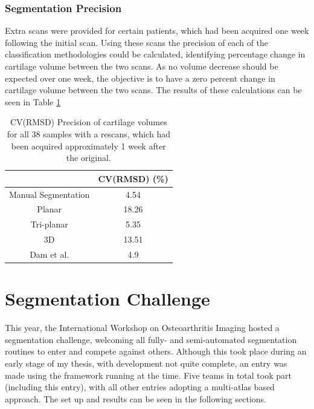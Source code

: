 \documentclass[11pt,a4paper]{memoir}
\numberwithin{figure}{section}
\numberwithin{table}{section}
\numberwithin{equation}{section}
\begin{document}
\subsubsection{Segmentation Precision}
 
Extra scans were provided for certain patients, which had been acquired one week following the initial scan. Using these scans the precision of each of the classification methodologies could be calculated, identifying percentage change in cartilage volume between the two scans. As no volume decrease should be expected over one week, the objective is to have a zero percent change in cartilage volume between the two scans. The results of these calculations can be seen in Table \ref{RMSDCV}

\begin{table}[!h]
\centering
\caption[Presicion of cartilage segmentation for all CNN architectures]{CV(RMSD) Precision of cartilage volumes for all 38 samples with a rescans, which had been acquired approximately 1 week after the original. }

\label{RMSDCV}
\begin{tabular}{|c|c|}
\hline
                  & CV(RMSD) (\%) \\ \hline
Manual Segmentation & 4.54         \\ \hline
Planar            & 18.26        \\ \hline
Tri-planar        & 5.35         \\ \hline
3D                & 13.51        \\ \hline
Dam et al.        & 4.9          \\ \hline
\end{tabular}
\end{table}

\section{Segmentation Challenge}
This year, the International Workshop on Osteoarthritis Imaging \cite{2016InternationalChallenge} hosted a segmentation challenge, welcoming all fully- and semi-automated segmentation routines to enter and compete against others. Although this took place during an early stage of my thesis, with development not quite complete, an entry was made using the framework running at the time. Five teams in total took part (including this entry), with all other entries adopting a multi-atlas based approach. The set up and results can be seen in the following sections.
\end{document}
